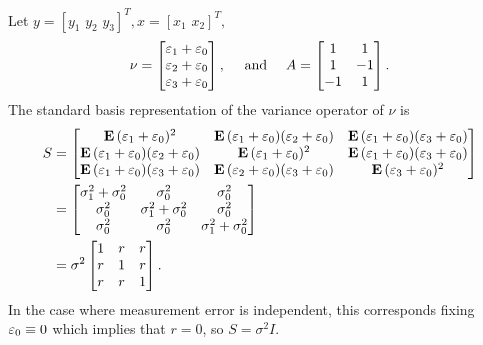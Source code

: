 \documentclass{homework}
\begin{document}
\newpage
\begin{solution}
  Let $y = [y_1\,\, y_2\,\, y_3]^T, x = [x_1\,\, x_2]^T,$ 
  $$
  \nu = \begin{bmatrix}
    \varepsilon_1 + \varepsilon_0\\
    \varepsilon_2 + \varepsilon_0\\
    \varepsilon_3 + \varepsilon_0\\
  \end{bmatrix},
  \quad\text{ and }\quad
  A = \begin{bmatrix} 
    1 & 1 \\
    1 &-1 \\
    -1& 1 \\
  \end{bmatrix}.
  $$
  The standard basis representation of the variance operator of $\nu$ is
  \begin{align*}
  S 
  &= \begin{bmatrix}
    \mathrm{\bf E}\, (\varepsilon_1 + \varepsilon_0)^2& \mathrm{\bf E}\, (\varepsilon_1 + \varepsilon_0)(\varepsilon_2 + \varepsilon_0) & \mathrm{\bf E}\, (\varepsilon_1 + \varepsilon_0)(\varepsilon_3 + \varepsilon_0)\\
    \mathrm{\bf E}\, (\varepsilon_1 + \varepsilon_0)(\varepsilon_2 + \varepsilon_0)& \mathrm{\bf E}\, (\varepsilon_1 + \varepsilon_0)^2 & \mathrm{\bf E}\, (\varepsilon_1 + \varepsilon_0)(\varepsilon_3 + \varepsilon_0)\\
    \mathrm{\bf E}\, (\varepsilon_1 + \varepsilon_0)(\varepsilon_3 + \varepsilon_0)& \mathrm{\bf E}\, (\varepsilon_2 + \varepsilon_0)(\varepsilon_3 + \varepsilon_0)& \mathrm{\bf E}\, (\varepsilon_3 + \varepsilon_0)^2\\
  \end{bmatrix}\\
  &= \begin{bmatrix}
    \sigma_1^2 + \sigma_0^2 & \sigma_0^2 & \sigma_0^2\\
    \sigma_0^2 & \sigma_1^2 + \sigma_0^2 & \sigma_0^2\\
    \sigma_0^2 & \sigma_0^2 & \sigma_1^2 + \sigma_0^2\\
  \end{bmatrix}\\
  &= \sigma^2 \begin{bmatrix}
    1 & r & r \\
    r & 1 & r \\ 
    r & r & 1 \\
  \end{bmatrix}.
\end{align*}
In the case where measurement error is independent, this corresponds fixing $\varepsilon_0 \equiv 0$ which implies that $r = 0$, so $S = \sigma^2 I$.
\end{solution}

\end{document}
